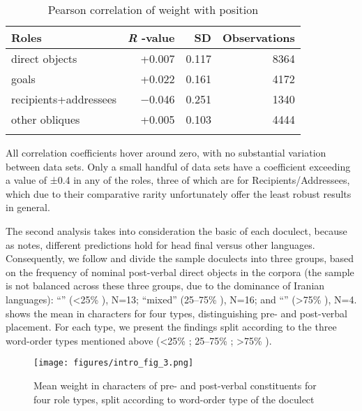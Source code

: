 \documentclass[output=paper,colorlinks,citecolor=brown,collectionchapter]{langscibook}
\begin{document}
\begin{table}
    \begin{tabular}{lrrr}
\lsptoprule
Roles & \textit{R} -value & SD & Observations \\
\midrule
direct objects & +0.007 & 0.117 & 8364 \\
goals & +0.022 & 0.161 & 4172 \\
recipients+addressees & $-$0.046 & 0.251 & 1340 \\
other obliques & +0.005 & 0.103 & 4444 \\
\lspbottomrule
    \end{tabular}
    \caption{Pearson correlation of weight with position }
    \label{Intro:tab:5}
\end{table}

All correlation coefficients hover around zero, with no substantial variation between data sets. Only a small handful of data sets have a coefficient exceeding a value of ±0.4 in any of the roles, three of which are for Recipients/Addressees, which due to their comparative rarity unfortunately offer the least robust results in general.

The second analysis takes into consideration the basic  of each doculect, because as \citet[11]{wasow_factors_2022} notes, different predictions hold for head final versus other languages. Consequently, we follow \citet{levshina_token-based_2019}  and divide the sample doculects into three groups, based on the frequency of nominal post-verbal direct objects in the corpora (the sample is not balanced across these three groups, due to the dominance of  Iranian languages): ``'' (<25\% ), N=13; ``mixed'' (25--75\% ), N=16; and ``'' (>75\% ), N=4.   shows the mean  in characters for four  types, distinguishing pre- and post-verbal placement. For each  type, we present the findings split according to the three word-order types mentioned above (<25\% ; 25--75\% ; >75\% ).

\begin{figure}
    \texttt{[image: figures/intro\_fig\_3.png]}
    \caption{Mean weight in characters of pre- and post-verbal constituents for four role types, split according to word-order type of the doculect}
    \label{Intro:fig:3}
\end{figure}
\end{document}
